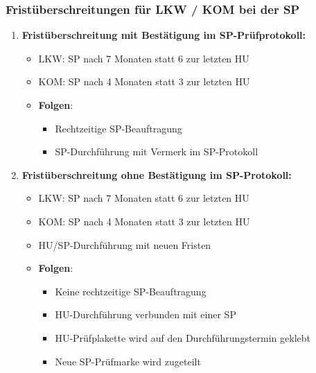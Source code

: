 \documentclass{vorlage-design-main}
\begin{document}
\subsubsection{Fristüberschreitungen für LKW / KOM bei der
SP}\label{fristueberschreitungen-fuer-lkw-kom-bei-der-sp}

\begin{enumerate}
\def\labelenumi{\arabic{enumi}.}

\item
  \textbf{Fristüberschreitung mit Bestätigung im SP-Prüfprotokoll:}

  \begin{itemize}

  \item
    LKW: SP nach 7 Monaten statt 6 zur letzten HU
  \item
    KOM: SP nach 4 Monaten statt 3 zur letzten HU
  \item
    \textbf{Folgen}:

    \begin{itemize}

    \item
      Rechtzeitige SP-Beauftragung
    \item
      SP-Durchführung mit Vermerk im SP-Protokoll
    \end{itemize}
  \end{itemize}
\item
  \textbf{Fristüberschreitung ohne Bestätigung im SP-Protokoll:}

  \begin{itemize}

  \item
    LKW: SP nach 7 Monaten statt 6 zur letzten HU
  \item
    KOM: SP nach 4 Monaten statt 3 zur letzten HU
  \item
    HU/SP-Durchführung mit neuen Fristen
  \item
    \textbf{Folgen}:

    \begin{itemize}

    \item
      Keine rechtzeitige SP-Beauftragung
    \item
      HU-Durchführung verbunden mit einer SP
    \item
      HU-Prüfplakette wird auf den Durchführungstermin geklebt
    \item
      Neue SP-Prüfmarke wird zugeteilt
    \end{itemize}
  \end{itemize}
\end{enumerate}
\end{document}
